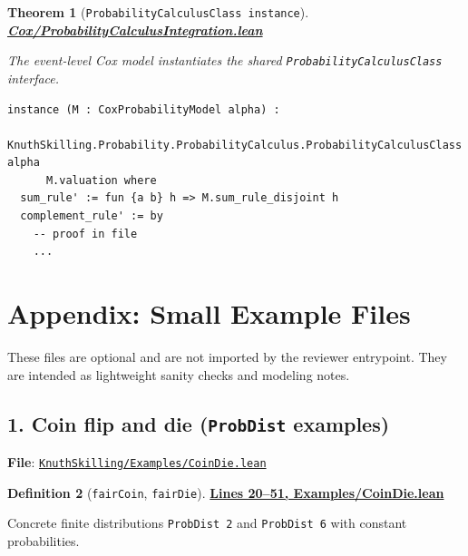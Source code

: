 \documentclass[11pt]{article}
\newtheorem{theorem}{Theorem}[section]
\theoremstyle{definition}
\newtheorem{definition}[theorem]{Definition}
\theoremstyle{remark}
\begin{document}
\begin{theorem}[\texttt{ProbabilityCalculusClass instance}]
\textbf{\href{https://github.com/zariuq/ks-foundations-of-inference/blob/main/ProbabilityTheory/Cox/ProbabilityCalculusIntegration.lean}{Cox/ProbabilityCalculusIntegration.lean}}

The event-level Cox model instantiates the shared \texttt{ProbabilityCalculusClass} interface.
\end{theorem}

\begin{lstlisting}[caption={ProbabilityCalculusClass instance for CoxProbabilityModel}]
instance (M : CoxProbabilityModel alpha) :
    KnuthSkilling.Probability.ProbabilityCalculus.ProbabilityCalculusClass alpha
      M.valuation where
  sum_rule' := fun {a b} h => M.sum_rule_disjoint h
  complement_rule' := by
    -- proof in file
    ...
\end{lstlisting}

\section*{Appendix: Small Example Files}
\label{app:examples}

These files are optional and are not imported by the reviewer entrypoint.  They are intended as
lightweight sanity checks and modeling notes.

\subsection*{1. Coin flip and die (\texttt{ProbDist} examples)}

\textbf{File}: \href{https://github.com/zariuq/ks-foundations-of-inference/blob/main/KnuthSkilling/Examples/CoinDie.lean}{\texttt{KnuthSkilling/Examples/CoinDie.lean}}

\begin{definition}[\texttt{fairCoin}, \texttt{fairDie}]
\textbf{\href{https://github.com/zariuq/ks-foundations-of-inference/blob/main/KnuthSkilling/Examples/CoinDie.lean\#L20-L51}{Lines 20--51, Examples/CoinDie.lean}}

Concrete finite distributions \texttt{ProbDist 2} and \texttt{ProbDist 6} with constant probabilities.
\end{definition}
\end{document}
